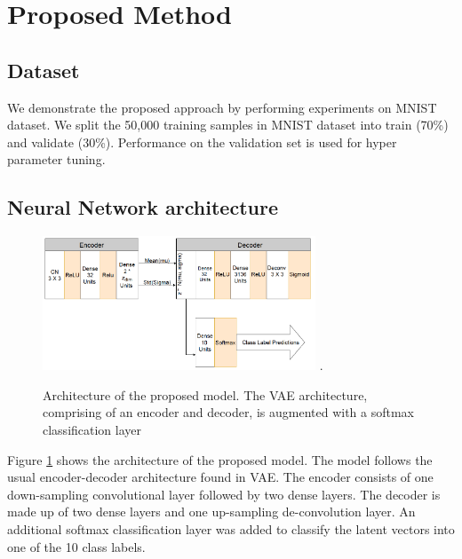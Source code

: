\documentclass{bmvc2k}
\begin{document}
\section{Proposed Method}

\subsection{Dataset}
We demonstrate the proposed approach by performing experiments on MNIST dataset.
We split the 50,000 training samples in MNIST dataset into  train (70\%) and validate (30\%).
Performance on the validation set is used for hyper parameter tuning.

\subsection{Neural Network architecture}

\begin{figure}[!t]
\centering
\includegraphics[width=3.2in]{images/vae_arch_v4}
\DeclareGraphicsExtensions.
\vspace{0.1in}
\caption{Architecture of the proposed model. The VAE architecture, comprising of an encoder and decoder, is augmented with a softmax classification layer}
\label{vae_architecture}
\end{figure}

Figure \ref{vae_architecture} shows the architecture of the proposed model.
The model follows the usual encoder-decoder architecture found in VAE.
The encoder consists of one down-sampling convolutional layer followed by two dense layers.
The decoder is made up of two dense layers and one up-sampling de-convolution layer.
An additional softmax classification layer was added to classify the latent vectors into one of the 10 class labels.
\end{document}
